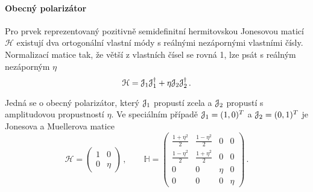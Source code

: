 \paragraph{Obecný polarizátor}

Pro prvek reprezentovaný pozitivně semidefinitní hermitovskou Jonesovou maticí $\mathcal{H}$ existují dva ortogonální vlastní módy s reálnými nezápornými vlastními čísly.
Normalizací matice tak, že větší z vlastních čísel se rovná 1, lze psát s reálným nezáporným $\eta$
\begin{equation}
    \mathcal{H}=\mathcal{J}_1 \mathcal{J}_1^\dagger + \eta \mathcal{J}_2 \mathcal{J}_2^\dagger \,.
\end{equation}

Jedná se o obecný polarizátor, který $\mathcal{J}_1$ propustí zcela a $\mathcal{J}_2$ propustí s amplitudovou propustností $\eta$.
Ve speciálním případě $\mathcal{J}_1=(1,0)^T$ a $\mathcal{J}_2=(0,1)^T$ je Jonesova a Muellerova matice
\begin{equation}
    \mathcal{H}=\begin{pmatrix}
        1 & 0 \\ 0 & \eta
        \end{pmatrix} \,, \qquad
    \mathbb{H}=\begin{pmatrix}
        \frac{1+\eta^2}{2} & \frac{1-\eta^2}{2} & 0 & 0 \\ \frac{1-\eta^2}{2} & \frac{1+\eta^2}{2} & 0 & 0 \\
        0 & 0 & \eta & 0 \\ 0 & 0 & 0 & \eta
        \end{pmatrix} \,.
\end{equation}


